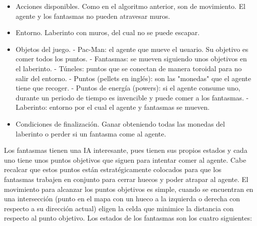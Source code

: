 		\begin{itemize}		
			\item Acciones disponibles. Como en el algoritmo anterior, son de movimiento. El agente y los fantasmas no pueden atravesar muros.
			\vspace*{-0.2cm}
			\item Entorno. Laberinto con muros, del cual no se puede escapar.
			\item Objetos del juego. 
			\vspace*{-0.3cm}
				\subitem - Pac-Man: el agente que mueve el usuario. Su objetivo es comer todos los puntos.
				\vspace{-1cm}
				\subitem - Fantasmas: se mueven siguiendo unos objetivos en el laberinto.
				\vspace{-0.2cm}
				\subitem - Túneles: puntos que se conectan de manera toroidal para no salir del entorno.
				\vspace{-0.2cm}
				\subitem - Puntos (pellets en inglés): son las "monedas" que el agente tiene que recoger.
				\vspace{-0.2cm}
				\subitem - Puntos de energía (powers): si el agente consume uno, durante un periodo de \hspace*{1.25cm} tiempo es invencible y puede comer a los fantasmas.				
				\vspace{-0.2cm}
				\subitem - Laberinto: entorno por el cual el agente y fantasmas se mueven.
			\vspace*{-0.3cm}
			\item Condiciones de finalización. Ganar obteniendo todas las monedas del laberinto o perder si un fantasma come al agente. 			
		\end{itemize}
		
		
		Los fantasmas tienen una IA interesante, pues tienen sus propios estados y cada uno tiene unos puntos objetivos que siguen para intentar comer al agente. Cabe recalcar que estos puntos están estratégicamente colocados para que los fantasmas trabajen en conjunto para cerrar huecos y poder atrapar al agente. El movimiento para alcanzar los puntos objetivos es simple, cuando se encuentran en una intersección (punto en el mapa con un hueco a la izquierda o derecha con respecto a su dirección actual) eligen la celda que minimice la distancia con respecto al punto objetivo. Los estados de los fantasmas son los cuatro siguientes:
		
